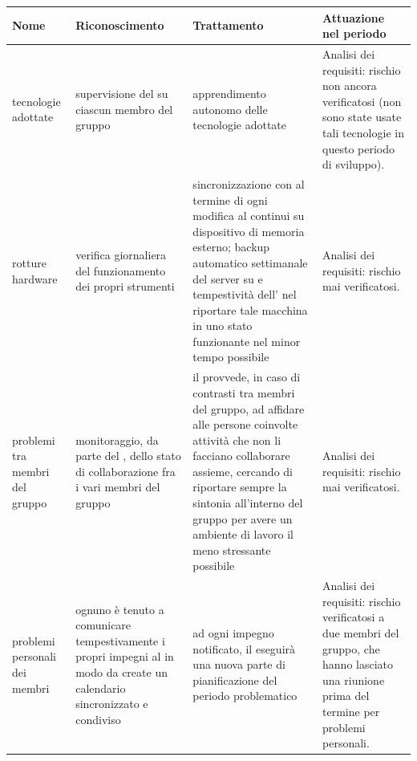 \newpage

\begin{adjustwidth}{-3cm}{-3cm}
\begin{center}
\begin{tabular}{| p{3cm} | p{3.5cm} | p{4cm} | p{3cm} |}
	\hline
	\textbf{Nome} & \textbf{Riconoscimento} & \textbf{Trattamento} & \textbf{Attuazione nel periodo} \\
	\hline
	tecnologie adottate & supervisione del \Rx{} su ciascun membro del gruppo & apprendimento autonomo delle tecnologie adottate & Analisi dei requisiti: rischio non ancora verificatosi (non sono state usate tali tecnologie in questo periodo di sviluppo). \\
	rotture hardware & verifica giornaliera del funzionamento dei propri strumenti & sincronizzazione con \gloss{GitHub} al termine di ogni modifica al \gloss{repository} continui \gloss{backup} su dispositivo di memoria esterno; backup automatico settimanale del server su \gloss{AWS} e tempestività dell’\AM{} nel riportare tale macchina in uno stato funzionante nel minor tempo possibile & Analisi dei requisiti: rischio mai verificatosi. \\
	problemi tra membri del gruppo & monitoraggio, da parte del \Rx{}, dello stato di collaborazione fra i vari membri del gruppo & il \Rx{} provvede, in caso di contrasti tra membri del gruppo, ad affidare alle persone coinvolte attività che non li facciano collaborare assieme, cercando di riportare sempre la sintonia all'interno del gruppo per avere un ambiente di lavoro il meno stressante possibile & Analisi dei requisiti: rischio mai verificatosi. \\
	problemi personali dei membri & ognuno è tenuto a comunicare tempestivamente i propri impegni al \Rx{} in modo da create un calendario sincronizzato e condiviso & ad ogni impegno notificato, il \Rx{} eseguirà una nuova parte di pianificazione del periodo problematico & Analisi dei requisiti: rischio verificatosi  a due membri del gruppo, che hanno lasciato una riunione prima del termine per problemi personali. \\
	
	
	
\end{tabular}
\end{center}
\end{adjustwidth}

